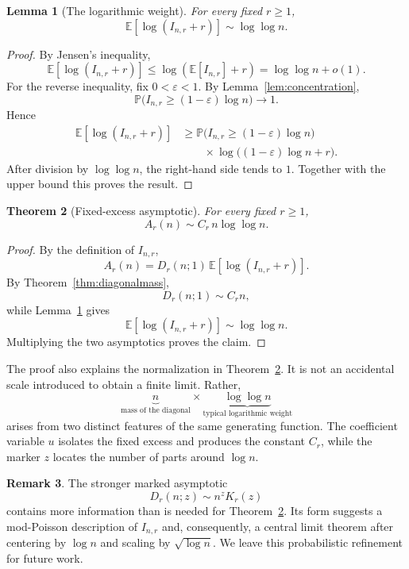 \documentclass[11pt]{article}
\newtheorem{theorem}{Theorem}[section]
\newtheorem{lemma}[theorem]{Lemma}
\theoremstyle{definition}
\newtheorem{remark}[theorem]{Remark}
\begin{document}
\begin{lemma}[The logarithmic weight]\label{lem:logweight}
For every fixed $r\geq1$,
\[
        \mathbb E[\log(I_{n,r}+r)]
        \sim\log\log n.
\]
\end{lemma}

\begin{proof}
By Jensen's inequality,
\[
 \mathbb E[\log(I_{n,r}+r)]
 \leq
 \log(\mathbb E[I_{n,r}]+r)
 =
 \log\log n+o(1).
\]
For the reverse inequality, fix $0<\varepsilon<1$.  By
Lemma~\ref{lem:concentration},
\[
 \mathbb P\bigl(
 I_{n,r}\geq(1-\varepsilon)\log n
 \bigr)
 \longrightarrow1.
\]
Hence
\begin{align*}
 \mathbb E[\log(I_{n,r}+r)]
 &\geq
 \mathbb P\bigl(
 I_{n,r}\geq(1-\varepsilon)\log n
 \bigr)\\
 &\qquad{}\times
 \log\bigl((1-\varepsilon)\log n+r\bigr).
\end{align*}
After division by $\log\log n$, the right-hand side tends to $1$.
Together with the upper bound this proves the result.
\end{proof}

\begin{theorem}[Fixed-excess asymptotic]\label{thm:main}
For every fixed $r\geq1$,
\[
        A_r(n)\sim C_r\,n\log\log n.
\]
\end{theorem}

\begin{proof}
By the definition of $I_{n,r}$,
\[
A_r(n)
=
D_r(n;1)\,
\mathbb E[\log(I_{n,r}+r)].
\]
By Theorem~\ref{thm:diagonalmass},
\[
D_r(n;1)\sim C_r n,
\]
while Lemma~\ref{lem:logweight} gives
\[
\mathbb E[\log(I_{n,r}+r)]
\sim\log\log n.
\]
Multiplying the two asymptotics proves the claim.
\end{proof}



The proof also explains the normalization in
Theorem~\ref{thm:main}.  It is not an accidental scale introduced to
obtain a finite limit.  Rather,
\[
 \underbrace{n}_{\text{mass of the diagonal}}
 \times
 \underbrace{\log\log n}_{\text{typical logarithmic weight}}
\]
arises from two distinct features of the same generating function.
The coefficient variable $u$ isolates the fixed excess and produces
the constant $C_r$, while the marker $z$ locates the number of parts
around $\log n$.

\begin{remark}
The stronger marked asymptotic
\[
        D_r(n;z)
        \sim n^zK_r(z)
\]
contains more information than is needed for
Theorem~\ref{thm:main}.  Its form suggests a mod-Poisson description
of $I_{n,r}$ and, consequently, a central limit theorem after
centering by $\log n$ and scaling by $\sqrt{\log n}$.  We leave this
probabilistic refinement for future work.
\end{remark}
\end{document}
